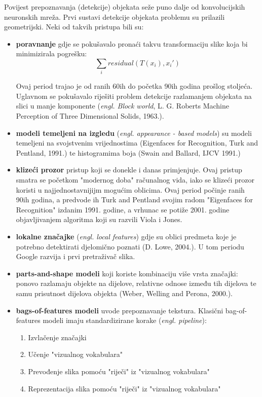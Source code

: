 Povijest prepoznavanja (detekcije) objekata seže puno dalje od konvolucijskih neuronskih mreža. Prvi sustavi detekcije objekata problemu su prilazili geometrijski. Neki od takvih pristupa bili su:

\begin{itemize}
\item \textbf{poravnanje} gdje se pokušavalo pronaći takvu transformaciju slike koja bi minimizirala pogrešku:
\[\sum_{i} residual(T(x_i), x_i')\]

Ovaj period trajao je od ranih 60ih do početka 90ih godina prošlog stoljeća. Uglavnom se pokušavalo riješiti problem detekcije razlamanjem objekata na slici u manje komponente (\textit{engl. Block world}, L. G. Roberts Machine Perception of Three Dimensional Solids, 1963.).
\item \textbf{modeli temeljeni na izgledu} (\textit{engl. appearance - based models}) su modeli temeljeni na svojstvenim vrijednostima (Eigenfaces for Recognition, Turk and Pentland, 1991.) te histogramima boja (Swain and Ballard, IJCV 1991.)
\item \textbf{klizeći prozor} pristup koji se donekle i danas primjenjuje. Ovaj pristup smatra se početkom "modernog doba" računalnog vida, iako se klizeći prozor koristi u najjednostavnijijm mogućim oblicima. Ovaj period počinje ranih 90ih godina, a predvode ih Turk and Pentland svojim radom "Eigenfaces for Recognition" izdanim 1991. godine, a vrhunac se potiže 2001. godine objavljivanjem algoritma koji su razvili Viola i Jones.
\item \textbf{lokalne značajke} (\textit{engl. local features}) gdje su oblici predmeta koje je potrebno detektirati djelomično poznati (D. Lowe, 2004.). U tom periodu Google razvija i prvi pretraživač slika. 
\item \textbf{parts-and-shape modeli} koji koriste kombinaciju više vrsta značajki: ponovo razlamaju objekte na dijelove, relativne odnose između tih dijelova te samu prisutnost dijelova objekta (Weber, Welling and Perona, 2000.).
\item \textbf{bags-of-features modeli} uvode prepoznavanje tekstura. Klasični bag-of-features modeli imaju standardizirane korake (\textit{engl. pipeline}): 
\begin{enumerate}
\item Izvlačenje značajki
\item Učenje "vizualnog vokabulara"
\item Prevođenje slika pomoću "riječi" iz "vizualnog vokabulara"
\item Reprezentacija slika pomoću "riječi" iz "vizualnog vokabulara"
\end{enumerate}
\end{itemize}